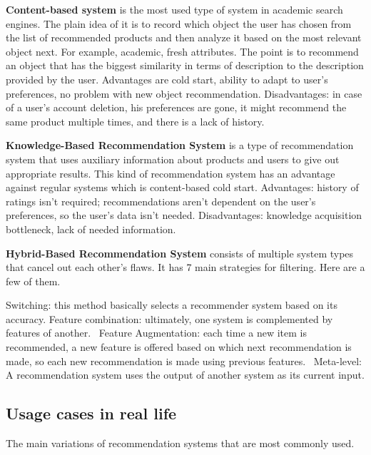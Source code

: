 \documentclass[10pt,twoside,english,a4paper]{article}
\begin{document}
\par \textbf{Content-based system} is the most used type of system in academic search engines. The plain idea of it is to record which object the user has chosen from the list of recommended products and then analyze it based on the most relevant object next. For example, academic, fresh attributes. The point is to recommend an object that has the biggest similarity in terms of description to the description provided by the user. Advantages are cold start, ability to adapt to user's preferences, no problem with new object recommendation. Disadvantages: in case of a user's account deletion, his preferences are gone, it might recommend the same product multiple times, and there is a lack of history.

\par \textbf{Knowledge-Based Recommendation System} is a type of recommendation system that uses auxiliary information about products and users to give out appropriate results. This kind of recommendation system has an advantage against regular systems which is content-based cold start.
Advantages: history of ratings isn't required; recommendations aren't dependent on the user's preferences, so the user's data isn't needed. Disadvantages: knowledge acquisition bottleneck, lack of needed information.

\par \textbf{Hybrid-Based Recommendation System} consists of multiple system types that cancel out each other's flaws. It has 7 main strategies for filtering. Here are a few of them.
\par Switching: this method basically selects a recommender system based on its accuracy. Feature combination: ultimately, one system is complemented by features of another. 
Feature Augmentation: each time a new item is recommended, a new feature is offered based on which next recommendation is made, so each new recommendation is made using previous features. 
Meta-level: A recommendation system uses the output of another system as its current input.
\subsection{Usage cases in real life}
The main variations of recommendation systems that are most commonly used.
\end{document}
